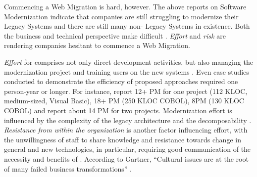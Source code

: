 Commencing a \gls{Web Migration} is hard, however.
The above reports on \gls{Software Modernization} indicate that companies are still struggling to modernize their \glspl{Legacy System} and there are still many non- \glspl{Legacy System} in existence.
Both the business and technical perspective make  difficult \autocite{Khadka2014ProfessionalsModernization}.
\emph{Effort} and \emph{risk} \autocite{Khadka2014ProfessionalsModernization,Canfora2000Decomposing,Bisbal1999LegacyInformationSystems,Heil2018ReWaMP} are rendering companies hesitant to commence a \gls{Web Migration}.

\emph{Effort} \autocite{ISO/IEEE24765Vocabulary} for  comprises not only direct development activities, but also managing the modernization project and training users on the new systems \autocite{ISO/IEEE2006SoftwareLifeCycle,Sneed2010SoftwareMigration,Seacord2003ModernizingLS}.
Even case studies conducted to demonstrate the efficiency of proposed  approaches required one person-year or longer.
For instance, \citet{Distante2006CaseStudy} report 12+ PM for one project (112 KLOC, medium-sized, Visual Basic), \citet{Bernhart2012} 18+ PM (250 KLOC COBOL), \citet{Aversano2001} 8PM (130 KLOC COBOL) and \citet{Maenhaut2015} report about 14 PM
for two projects.
Modernization effort is influenced by the complexity of the legacy architecture \autocite{Khadka2014ProfessionalsModernization} and the decomposability \autocite{Aversano2001,Lucia2006,Brodie1995Migrating}.
\emph{Resistance from within the organization} \autocite{Sneed2010ReMiP} is another factor influencing effort, with the unwillingness of staff to share knowledge and resistance towards change in general and new technologies, in particular, requiring good communication of the necessity and benefits of  \autocite{Khadka2014ProfessionalsModernization}.
According to Gartner, ``Cultural issues are at the root of many failed business transformations'' \autocite{Gartner2016Culture}.

